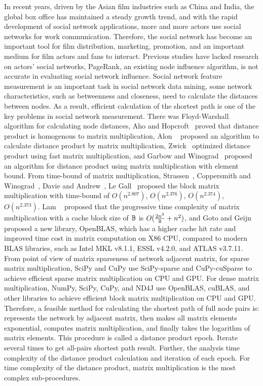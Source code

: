 \documentclass[review]{cvpr}
\begin{document}
In recent years, driven by the Asian film industries such as China and India, the global box office has maintained a steady growth trend, and with the rapid development of social network applications, more and more actors use social networks for work communication.
Therefore, the social network has become an important tool for film distribution, marketing, promotion, and an important medium for film actors and fans to interact.
Previous studies have lacked research on actors' social networks, PageRank, an existing node influence algorithm, is not accurate in evaluating social network influence.
Social network feature measurement is an important task in social network data mining, some network characteristics, such as betweenness and closeness, need to calculate the distances between nodes.
As a result, efficient calculation of the shortest path is one of the key problems in social network measurement.
There was Floyd-Warshall~\cite{floyd1962algorithm,warshall1962theorem} algorithm for calculating node distances, Aho and Hopcroft~\cite{aho1974design} proved that distance product is homogenous to matrix multiplication,
Alon \etal~\cite{alon1997exponent} proposed an algorithm to calculate distance product by matrix multiplication, Zwick~\cite{zwick2002all} optimized distance product using fast matrix multiplication,
and Garbow and Winograd~\cite{garbow1985scaling} proposed an algorithm for distance product using matrix multiplication with element bound.
From time-bound of matrix multiplication, Strassen~\cite{strassen1969gaussian}, Coppersmith and Winograd~\cite{coppersmith1987matrix}, Davie and Andrew~\cite{davie2013improved}, Le Gall~\cite{le2014powers} proposed the block matrix multiplication with time-bound of \(O(n ^ {2.807})\), \(O(n^{2.376})\), \(O(n^{2.374})\), \(O(n^{2.373})\).
Lam \etal~\cite{lam1991cache} proposed that the progressive time complexity of matrix multiplication with a cache block size of $\Bbb B$ is \(O({2n^3 \over \Bbb B}+{n^2})\),
and Goto and Geijn~\cite{goto2008anatomy} proposed a new library, OpenBLAS, which has a higher cache hit rate and improved time cost in matrix computation on X86 CPU, compared to modern BLAS libraries, such as Intel MKL v8.1.1, ESSL v4.2.0, and ATLAS v3.7.11.
From point of view of matrix sparseness of network adjacent matrix, for sparse matrix multiplication, SciPy and CuPy use SciPy-sparse and CuPy-cuSparse to achieve efficient sparse matrix multiplication on CPU and GPU.
For dense matrix multiplication, NumPy, SciPy, CuPy, and ND4J use OpenBLAS, cuBLAS, and other libraries to achieve efficient block matrix multiplication on CPU and GPU.
Therefore, a feasible method for calculating the shortest path of full node pairs is: represents the network by adjacent matrix, then makes all matrix elements exponential, computes matrix multiplication, and finally takes the logarithm of matrix elements.
This procedure is called a distance product epoch.
Iterate several times to get all-pairs shortest path result.
Further, the analysis time complexity of the distance product calculation and iteration of each epoch.
For time complexity of the distance product, matrix multiplication is the most complex sub-procedures.
\end{document}
